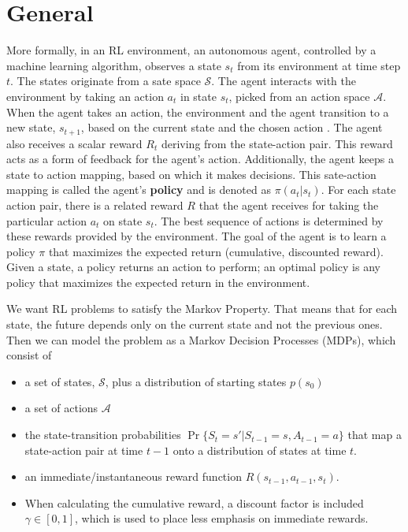 \documentclass[11pt, a4paper]{article}
\begin{document}
\section{General}
More formally, in an RL environment, an autonomous agent, controlled by a machine learning algorithm, observes
a state $s_t$ from its environment at time step $t$. The states originate from a sate space $\mathcal{S}$.
The agent interacts with the environment by taking an action $a_t$ in state $s_t$, picked from an action space $\mathcal{A}$.
When the agent takes an action, the environment and the agent transition to a new state, $s_{t+1}$,
based on the current state and the chosen action \cite{drlbs}. The agent also receives a scalar reward $R_t$ deriving from the
state-action pair. This reward acts as a form of feedback for the agent's action. Additionally, the agent keeps a state
to action mapping, based on which it makes decisions. This sate-action mapping is called the agent's \textbf{policy} and is denoted
as $\pi(a_t | s_t)$. For each state action pair, there is a related reward
$R$ that the agent receives for taking the particular action $a_t$ on state $s_t$. The best sequence of actions is
determined by these rewards provided by the environment.  The goal of the agent is to learn a policy  $\pi$ that maximizes the expected return (cumulative,
discounted reward). Given a state, a policy returns an action to perform; an optimal policy is any policy that maximizes the expected return
in the environment.

We want RL problems to satisfy the Markov Property. That means that for each state, the future depends only on the current state and not the previous ones.
Then we can model the problem as a Markov Decision Processes (MDPs), which consist of
\begin{itemize}
    \item a set of states, $\mathcal{S}$, plus a distribution of starting states $p(s_0)$
    \item a set of actions $\mathcal{A}$
    \item the state-transition probabilities $\Pr{\{S_t=s'|S_{t-1}=s, A_{t-1}=a\}}$ that map a \\state-action pair at time $t-1$
          onto a distribution of states at time $t$.
    \item an immediate/instantaneous reward function $R(s_{t-1}, a_{t-1}, s_t)$.
    \item When calculating the cumulative reward, a discount factor is included $\gamma \in [0,1]$, which is used to place less emphasis
          on immediate rewards.
\end{itemize}
\end{document}
